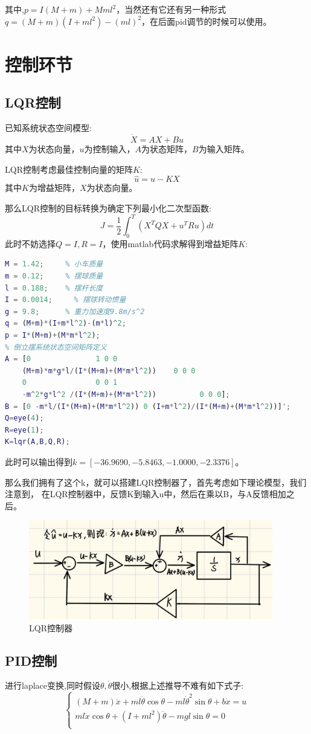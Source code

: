 \documentclass{article}
\begin{document}
其中,$p=I(M+m)+Mml^2$，当然还有它还有另一种形式$q=(M+m)(I+ml^2)-(ml)^2$，在后面pid调节的时候可以使用。
\section*{控制环节}
\subsection*{LQR控制}
已知系统状态空间模型:
\[
\dot{X}=AX+Bu
\]
其中$X$为状态向量，$u$为控制输入，$A$为状态矩阵，$B$为输入矩阵。

LQR控制考虑最佳控制向量的矩阵$K$:
\[
\hat{u}=u-KX
\]
其中$K$为增益矩阵，$X$为状态向量。

那么LQR控制的目标转换为确定下列最小化二次型函数:
\[
J=\frac{1}{2}\int_{0}^{T}(X^TQX+u^TRu)dt
\]
此时不妨选择$Q=I,R=I$，使用matlab代码求解得到增益矩阵$K$:
\begin{lstlisting}[language=matlab,numbers=none]
% 倒立摆系统参数
M = 1.42;     % 小车质量
m = 0.12;     % 摆球质量
l = 0.188;    % 摆杆长度
I = 0.0014;     % 摆球转动惯量
g = 9.8;      % 重力加速度9.8m/s^2
q = (M+m)*(I+m*l^2)-(m*l)^2;
p = I*(M+m)+(M*m*l^2);
% 倒立摆系统状态空间矩阵定义
A = [0               1 0 0
    (M+m)*m*g*l/(I*(M+m)+(M*m*l^2))    0 0 0
    0                0 0 1
    -m^2*g*l^2 /(I*(M+m)+(M*m*l^2))          0 0 0];
B = [0 -m*l/(I*(M+m)+(M*m*l^2)) 0 (I+m*l^2)/(I*(M+m)+(M*m*l^2))]';
Q=eye(4);
R=eye(1);
K=lqr(A,B,Q,R);
\end{lstlisting}
此时可以输出得到$k=[-36.9690   ,-5.8463   ,-1.0000   ,-2.3376]$。

那么我们拥有了这个k，就可以搭建LQR控制器了，首先考虑如下理论模型，我们注意到，
在LQR控制器中，反馈K到输入u中，然后在乘以B，与A反馈相加之后。
\begin{figure}[htbp]
    \centering
    \includegraphics[width=0.95\textwidth]{./imgs/LQR_OPTi.png}
    \caption{LQR控制器}
\end{figure}

\subsection*{PID控制}
进行laplace变换,同时假设$\theta,\dot{\theta}$很小,根据上述推导不难有如下式子:
\[\left\{\begin{matrix}
    (M+m)\ddot{x}+ml\ddot{\theta}\cos\theta -ml\dot{\theta}^2\sin\theta + b\dot{x} = u \\
    ml\ddot{x}\cos\theta+(I+ml^2)\ddot{\theta}-mgl\sin\theta = 0 \\
\end{matrix}
\right.\]
\end{document}
